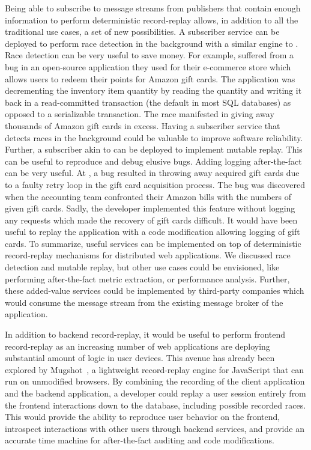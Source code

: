 Being able to subscribe to message streams from publishers that contain enough
information to perform deterministic record-replay allows, in addition to all the traditional \synapse
use cases, a set of new possibilities. A subscriber service can be deployed to
perform race detection in the background with a similar engine to \racepro.
Race detection can be very useful to save money. For example, \crowdtap suffered
from a bug in an open-source application they used for their e-commerce store
which allows users to redeem their points for Amazon gift cards.  The application
was decrementing the inventory item quantity by reading the quantity and writing
it back in a read-committed transaction (the default in most SQL databases) as
opposed to a serializable transaction. The race manifested in giving away
thousands of Amazon gift cards in excess. Having a subscriber service that
detects races in the background could be valuable to improve software
reliability.
Further, a subscriber akin to \dora can be deployed to implement mutable replay.
This can be useful to reproduce and debug elusive bugs. Adding logging after-the-fact
can be very useful. At \crowdtap, a bug resulted in throwing away acquired
gift cards due to a faulty retry loop in the gift card acquisition process.
The bug was discovered when the accounting team confronted their Amazon bills
with the numbers of given gift cards. Sadly, the developer implemented this
feature without logging any requests which made the recovery of gift cards
difficult. It would have been useful to replay the application with a code
modification allowing logging of gift cards.
To summarize, useful services can be implemented on top of deterministic
record-replay mechanisms for distributed web applications. We discussed race detection
and mutable replay, but other use cases could be envisioned, like performing
after-the-fact metric extraction, or performance analysis.
Further, these added-value services could be implemented by third-party
companies which would consume the message stream from the existing \synapse
message broker of the application.

In addition to backend record-replay, it would be useful to perform frontend
record-replay as an increasing number of web applications are deploying
substantial amount of logic in user devices. This avenue has already been
explored by Mugshot~\cite{mugshot}, a lightweight record-replay engine for
JavaScript that can run on unmodified browsers. By combining the recording
of the client application and the backend application, a developer could replay
a user session entirely from the frontend interactions down to the database,
including possible recorded races. This would provide the ability to reproduce
user behavior on the frontend, introspect interactions with other users through
backend services, and provide an accurate time machine for after-the-fact auditing
and code modifications.

